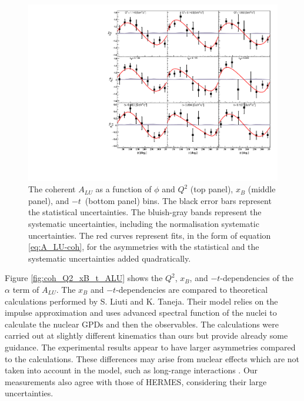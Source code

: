 \begin{figure}[tpb]
\centering
\includegraphics[scale=0.85]{fig_Dec2016/Coherent_ALU_phi.pdf}
\caption{The coherent $A_{LU}$ as a function of $\phi$ and $Q^2$ (top panel), 
   $x_{B}$ (middle panel), and $-t$~(bottom panel) bins. The black error bars 
   represent the statistical uncertainties. The bluish-gray bands represent the 
systematic uncertainties, including the normalisation systematic uncertainties.  
The red curves represent fits, in the form of equation \ref{eq:A_LU-coh}, for 
the asymmetries with the statistical and the systematic uncertainties added   
quadratically.}
\label{fig:bsa_coh_Q2_bins}
\end{figure}

Figure \ref{fig:coh_Q2_xB_t_ALU} shows the $Q^2$, $x_{B}$, and 
$-t$-dependencies of the $\alpha$ term of $A_{LU}$. The $x_{B}$ and 
$-t$-dependencies are compared to theoretical calculations performed by S.  
Liuti and K. Taneja. Their model relies on the impulse approximation and uses 
advanced spectral function of the nuclei to calculate the nuclear GPDs and then 
the observables. The calculations were carried out at slightly different 
kinematics than ours but provide already some guidance. The experimental 
results appear to have larger asymmetries compared to the calculations. These 
differences may arise from nuclear effects which are not taken into account in 
the model, such as long-range interactions \cite{simonetta_2}. Our measurements 
also agree with those of HERMES, considering their large uncertainties. 

